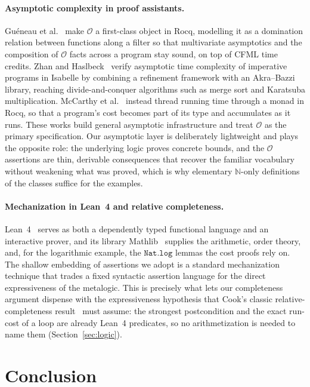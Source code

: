 \documentclass[runningheads]{llncs}
\newcommand{\Lean}{Lean~4\xspace}
\newcommand{\Nat}{\mathbb{N}}
\newcommand{\BigO}{\mathcal{O}}
\newcommand{\code}[1]{\texttt{#1}}
\begin{document}
\paragraph{Asymptotic complexity in proof assistants.}
Gu\'eneau et al.~\cite{Gueneau2018} make $\BigO$ a first-class object in Rocq,
modelling it as a domination relation between functions along a filter so that
multivariate asymptotics and the composition of $\BigO$ facts across a program
stay sound, on top of CFML time credits.
Zhan and Haslbeck~\cite{ZhanHaslbeck2018} verify asymptotic time complexity of
imperative programs in Isabelle by combining a refinement framework with an
Akra--Bazzi library, reaching divide-and-conquer algorithms such as merge sort and
Karatsuba multiplication.
McCarthy et al.~\cite{McCarthy2018} instead thread running time through a monad in
Rocq, so that a program's cost becomes part of its type and accumulates as it runs.
These works build general asymptotic infrastructure and treat $\BigO$ as the
primary specification.
Our asymptotic layer is deliberately lightweight and plays the opposite role: the
underlying logic proves concrete bounds, and the $\BigO$ assertions are thin,
derivable consequences that recover the familiar vocabulary without weakening what
was proved, which is why elementary $\Nat$-only definitions of the classes suffice
for the examples.

\paragraph{Mechanization in \Lean{} and relative completeness.}
\Lean{}~\cite{Moura2021} serves as both a dependently typed functional language and
an interactive prover, and its library Mathlib~\cite{Mathlib2020} supplies the
arithmetic, order theory, and, for the logarithmic example, the $\code{Nat.log}$
lemmas the cost proofs rely on.
The shallow embedding of assertions we adopt is a standard mechanization technique
that trades a fixed syntactic assertion language for the direct expressiveness of
the metalogic.
This is precisely what lets our completeness argument dispense with the
expressiveness hypothesis that Cook's classic relative-completeness
result~\cite{Cook1978} must assume: the strongest postcondition and the exact
run-cost of a loop are already \Lean{} predicates, so no arithmetization is needed
to name them (Section~\ref{sec:logic}).

\section{Conclusion}\label{sec:conclusion}
\end{document}

